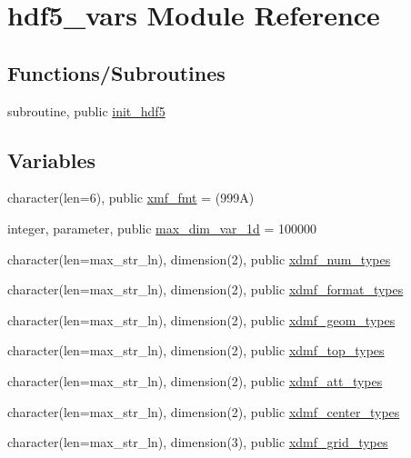 \hypertarget{namespacehdf5__vars}{}\section{hdf5\+\_\+vars Module Reference}
\label{namespacehdf5__vars}
\subsection*{Functions/\+Subroutines}
\begin{DoxyCompactItemize}
\item 
subroutine, public \hyperlink{namespacehdf5__vars_ab644703bcb67ce423732e39ab56a4b63}{init\+\_\+hdf5}
\end{DoxyCompactItemize}
\subsection*{Variables}
\begin{DoxyCompactItemize}
\item 
character(len=6), public \hyperlink{namespacehdf5__vars_ad8665a0387dde737161d1162565aefa9}{xmf\+\_\+fmt} = \textquotesingle{}(999\+A)\textquotesingle{}
\item 
integer, parameter, public \hyperlink{namespacehdf5__vars_a69c36b36ad7f55ff124ebc328d18adb7}{max\+\_\+dim\+\_\+var\+\_\+1d} = 100000
\item 
character(len=max\+\_\+str\+\_\+ln), dimension(2), public \hyperlink{namespacehdf5__vars_ad8c38b66b3e9b402f05e7e7a36415fb3}{xdmf\+\_\+num\+\_\+types}
\item 
character(len=max\+\_\+str\+\_\+ln), dimension(2), public \hyperlink{namespacehdf5__vars_ab9c0d2270239bf1963c6294ab7198f8c}{xdmf\+\_\+format\+\_\+types}
\item 
character(len=max\+\_\+str\+\_\+ln), dimension(2), public \hyperlink{namespacehdf5__vars_acabe6ee64c1612c30ab37774678238e5}{xdmf\+\_\+geom\+\_\+types}
\item 
character(len=max\+\_\+str\+\_\+ln), dimension(2), public \hyperlink{namespacehdf5__vars_ad25ea0a5a9a4bb3f9248a7fa61ea1363}{xdmf\+\_\+top\+\_\+types}
\item 
character(len=max\+\_\+str\+\_\+ln), dimension(2), public \hyperlink{namespacehdf5__vars_a43c511f4b84cd716387c39c78b2cfe54}{xdmf\+\_\+att\+\_\+types}
\item 
character(len=max\+\_\+str\+\_\+ln), dimension(2), public \hyperlink{namespacehdf5__vars_a7f20d570d2304c8e953646599bf61d73}{xdmf\+\_\+center\+\_\+types}
\item 
character(len=max\+\_\+str\+\_\+ln), dimension(3), public \hyperlink{namespacehdf5__vars_ab7b59b4afbcaff92aa1c236c23a4bf58}{xdmf\+\_\+grid\+\_\+types}
\end{DoxyCompactItemize}


